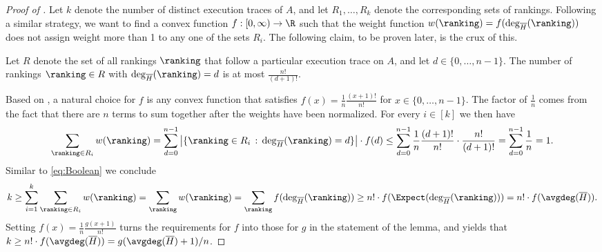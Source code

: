 \documentclass{toc}
\begin{document}
\begin{proof}[Proof of ]
Let $k$ denote the number of distinct execution traces of $A$, and let $R_1, \dots, R_k$ denote the corresponding sets of rankings. 
Following a similar strategy, we want to find a convex function $f: [0,\infty)\to \R$ such that the weight function $w(\ranking) = f(\deg_{\overline{H}}(\ranking))$ does not assign weight more than 1 to any one of the sets $R_i$. The following claim, to be proven later, is the crux of this.

\begin{claim}\label{claim:encoding}
Let $R$ denote the set of all rankings $\ranking$ that follow a particular execution trace on $A$, and let $d \in \{0,\dots,n-1\}$. The number of rankings $\ranking \in R$ with $\deg_{\overline{H}}(\ranking) = d$ is at most $\frac{n!}{(d+1)!}$.
\end{claim}

Based on , a natural choice for $f$ is any convex function that satisfies $f(x) = \frac{1}{n} \frac{(x+1)!}{n!}$ for $x \in \{0,\dots,n-1\}$. The factor of $\frac{1}{n}$ comes from the fact that there are $n$ terms to sum together after the weights have been normalized. For every $i \in [k]$ we then have
\[ \sum_{\ranking \in R_i} w(\ranking) = \sum_{d=0}^{n-1} \left| \{ \ranking \in R_i \, : \, \deg_{\overline{H}}(\ranking) = d \} \right| \cdot f(d) \le \sum_{d=0}^{n-1} \frac{1}{n} \frac{(d+1)!}{n!} \cdot \frac{n!}{(d+1)!} = \sum_{d=0}^{n-1} \frac{1}{n} = 1. \]
Similar to \eqref{eq:Boolean} we conclude
\begin{equation}\label{eq:lb:k}
k \ge \sum_{i=1}^k \sum_{\ranking \in R_i} w(\ranking) 
= \sum_\ranking w(\ranking)
= \sum_\ranking f(\deg_{\overline{H}}(\ranking)) \ge n! \cdot f(\Expect(\deg_{\overline{H}}(\ranking))) = n! \cdot f(\avgdeg(\overline{H})). 
\end{equation}
Setting $f(x) = \frac{1}{n} \frac{g(x+1)}{n!}$ turns the requirements for $f$ into those for $g$ in the statement of the lemma, and yields that $k \ge n! \cdot f(\avgdeg(\overline{H})) = g(\avgdeg(\overline{H})+1)/n$. 
\end{proof}
\end{document}
